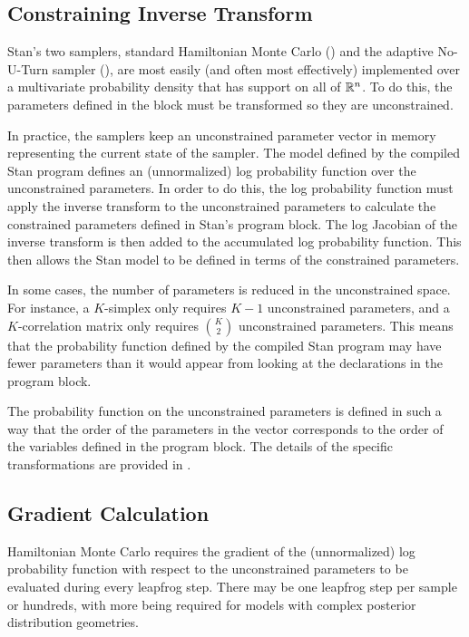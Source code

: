 \subsection{Constraining Inverse Transform}

Stan's two samplers, standard Hamiltonian Monte Carlo (\HMC) and the
adaptive No-U-Turn sampler (\NUTS), are most easily (and often most
effectively) implemented over a multivariate probability density that
has support on all of $\reals^n$.  To do this, the parameters
defined in the  block must be transformed so they are
unconstrained. 

In practice, the samplers keep an unconstrained parameter vector in
memory representing the current state of the sampler.  The model
defined by the compiled Stan program defines an (unnormalized) log
probability function over the unconstrained parameters.  In order to
do this, the log probability function must apply the inverse transform
to the unconstrained parameters to calculate the constrained
parameters defined in Stan's  program block.  The
log Jacobian of the inverse transform is then added to the accumulated
log probability function.  This then allows the Stan model to be
defined in terms of the constrained parameters.

In some cases, the number of parameters is reduced in the
unconstrained space.  For instance, a $K$-simplex only requires $K-1$
unconstrained parameters, and a $K$-correlation matrix only requires
$\binom{K}{2}$ unconstrained parameters.  This means that the
probability function defined by the compiled Stan program may have
fewer parameters than it would appear from looking at the declarations
in the  program block. 

The probability function on the unconstrained parameters is defined in
such a way that the order of the parameters in the vector corresponds
to the order of the variables defined in the  program
block.  The details of the specific transformations are provided in
.

\subsection{Gradient Calculation}

Hamiltonian Monte Carlo requires the gradient of the (unnormalized)
log probability function with respect to the unconstrained parameters
to be evaluated during every leapfrog step.  There may be one leapfrog
step per sample or hundreds, with more being required for models with
complex posterior distribution geometries.

